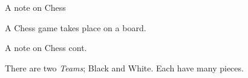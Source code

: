 \documentclass{beamer}
\begin{document}
\begin{frame}{A note on Chess}

A Chess game takes place on a board.

\begin{figure}[h]
    \centering
    \showboard
    \label{emptyboard}
\end{figure}

\end{frame}

\begin{frame}{A note on Chess cont.}

There are two \emph{Teams}; Black and White. Each have many pieces.

\begin{figure}[h]
    \centering
    \newgame
    \showboard
    \label{startboard1}
\end{figure}

\end{frame}


    
    




\end{document}
